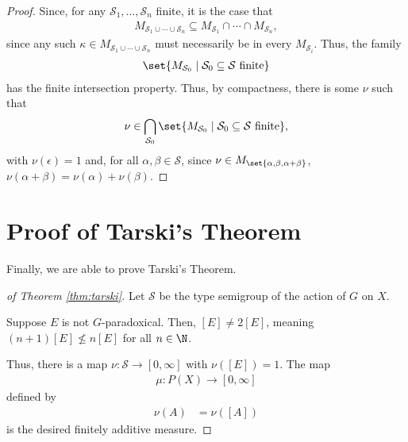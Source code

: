 \begin{proof}
  Since, for any $\mathcal{S}_1,\dots,\mathcal{S}_n$ finite, it is the case that
  \begin{align*}
    M_{\mathcal{S}_1\cup\cdots\cup \mathcal{S}_n} \subseteq M_{\mathcal{S}_1} \cap \cdots \cap M_{\mathcal{S}_n},
  \end{align*}
  since any such $\kappa\in M_{\mathcal{S}_1\cup\cdots\cup \mathcal{S}_n}$ must necessarily be in every $M_{\mathcal{S}_i}$. Thus, the family
  \begin{align*}
    \set{M_{\mathcal{S}_0}\mid \mathcal{S}_0\subseteq \mathcal{S}\text{ finite}}
  \end{align*}
  has the finite intersection property. Thus, by compactness, there is some $\nu$ such that
  \begin{align*}
    \nu\in \bigcap_{\mathcal{S}_0}\set{M_{\mathcal{S}_0}\mid \mathcal{S}_0\subseteq \mathcal{S}\text{ finite}},
  \end{align*}
  with $\nu\left(\epsilon\right) = 1$ and, for all $\alpha,\beta\in \mathcal{S}$, since $\nu\in M_{\set{\alpha,\beta,\alpha + \beta}}$, $\nu\left(\alpha + \beta\right) = \nu\left(\alpha\right) + \nu\left(\beta\right)$.

\end{proof}
\section{Proof of Tarski's Theorem}%
Finally, we are able to prove Tarski's Theorem.
\begin{proof}[of Theorem \ref{thm:tarski}]
  Let $\mathcal{S}$ be the type semigroup of the action of $G$ on $X$.\newline

  Suppose $E$ is not $G$-paradoxical. Then, $\left[E\right]\neq 2\left[E\right]$, meaning $\left(n+1\right)\left[E\right]\nleq n\left[E\right]$ for all $n\in \N$.\newline

  Thus, there is a map $\nu: \mathcal{S}\rightarrow [0,\infty]$ with $\nu\left(\left[E\right]\right) = 1$. The map
  \begin{align*}
    \mu: P(X)\rightarrow [0,\infty]
  \end{align*}
  defined by
  \begin{align*}
    \nu\left(A\right) &= \nu\left(\left[A\right]\right)
  \end{align*}
  is the desired finitely additive measure.
\end{proof}

